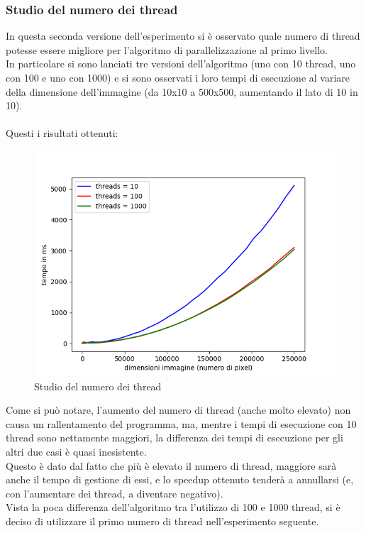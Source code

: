 \documentclass[10pt,twocolumn,letterpaper]{article}
\begin{document}
\subsubsection{Studio del numero dei thread}
In questa seconda versione dell'esperimento si è osservato quale numero di thread potesse essere migliore per l'algoritmo di parallelizzazione al primo livello.\\
In particolare si sono lanciati tre versioni dell'algoritmo (uno con 10 thread, uno con 100 e uno con 1000) e si sono osservati i loro tempi di esecuzione al variare della dimensione dell'immagine (da 10x10 a 500x500, aumentando il lato di 10 in 10).\\
\\
Questi i risultati ottenuti:
\begin{figure}[H]
\includegraphics[width=1\linewidth]{test/threadsTest/velocityTest/result.png} 
\caption{\small Studio del numero dei thread}
\label{omp2}
\end{figure}

Come si può notare, l'aumento del numero di thread (anche molto elevato) non causa un rallentamento del programma, ma, mentre i tempi di esecuzione con 10 thread sono nettamente maggiori, la differenza dei tempi di esecuzione per gli altri due casi è quasi inesistente.\\
Questo è dato dal fatto che più è elevato il numero di thread, maggiore sarà anche il tempo di gestione di essi, e lo speedup ottenuto tenderà a annullarsi (e, con l'aumentare dei thread, a diventare negativo).\\
Vista la poca differenza dell'algoritmo tra l'utilizzo di 100 e 1000 thread, si è deciso di utilizzare il primo numero di thread nell'esperimento seguente.
\end{document}
